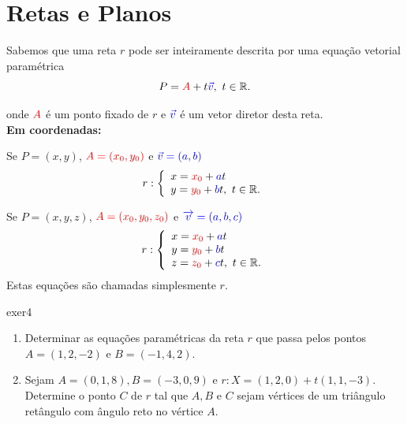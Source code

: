 \section{Retas e Planos}




Sabemos que uma reta $r$ pode ser inteiramente descrita por uma {\color{blue} equação vetorial paramétrica}
\[P={\color{red}A}+t{\color{blue}\vec{v}},\ t\in \mathbb{R}.\]
\begin{center}
\end{center}
onde ${\color{red} A}$ é um ponto fixado de $r$ e  ${\color{blue}\vec{v}}$ é um vetor diretor desta reta.\\


\noindent\textbf{Em coordenadas:}

Se	$P=(x,y)$, $\textcolor{red}{A=(x_0,y_0)}$ e $\textcolor{blue}{\vec{v}=(a,b)}$
\[	r: \left\{\begin{array}{l}
	x=\textcolor{red}{x_0}+\textcolor{blue}{a}t\\
	y=\textcolor{red}{y_0}+\textcolor{blue}{b}t,\  t\in \mathbb{R}.
\end{array}\right.\]

Se 	$P=(x,y,z)$, $\textcolor{red}{A=(x_0,y_0,z_0)}$ e $\textcolor{blue}{\overrightarrow{v}=(a,b,c)}$
\[r:	\left\{\begin{array}{l}
	x=\textcolor{red}{x_0}+\textcolor{blue}{a}t\\
	y=\textcolor{red}{y_0}+\textcolor{blue}{b}t\\
	z=\textcolor{red}{z_0}+\textcolor{blue}{c}t,\  t\in \mathbb{R}.
\end{array}\right.\]
Estas equações são chamadas simplesmente  $r$.


\begin{exeb}{}{exer4}
	\begin{enumerate}
		\item Determinar  as equações paramétricas da reta $r$ que passa pelos
		pontos $A = (1, 2, -2)$ e $B = (-1, 4, 2)$.

		\item Sejam $A=(0,1,8), B=(-3,0,9)$ e $r: X=(1,2,0)+t(1,1,-3)$. Determine o ponto $C$ de $r$ tal que $A,B$ e $C$ sejam vértices de um triângulo retângulo com ângulo reto no vértice $A$.
	\end{enumerate}
\end{exeb}
\newpage



